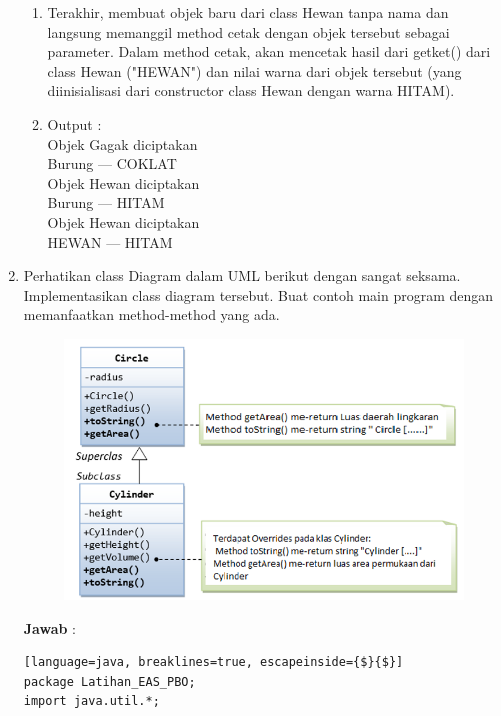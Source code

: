 \documentclass[a4paper, 12pt]{article}
\newcommand{\ans}{\textbf{Jawab} :}
\begin{document}
\begin{enumerate}
\begin{enumerate}[label=\textbullet]
            \item  Terakhir, membuat objek baru dari class Hewan tanpa nama dan langsung memanggil method cetak dengan objek tersebut sebagai parameter. Dalam method cetak, akan mencetak hasil dari getket() dari class Hewan ("HEWAN") dan nilai warna dari objek tersebut (yang diinisialisasi dari constructor class Hewan dengan warna HITAM).\\

            \item[]  
            Output  :\\
            Objek Gagak diciptakan\\
            Burung --- COKLAT \\
            Objek Hewan diciptakan\\
            Burung --- HITAM \\
            Objek Hewan diciptakan\\
            HEWAN --- HITAM 
         
        \end{enumerate}

        \item Perhatikan class Diagram dalam UML berikut dengan sangat seksama. Implementasikan class diagram tersebut. Buat contoh main program dengan memanfaatkan  method-method yang ada.\\
        \begin{figure}[h]
            \centering
            \includegraphics[width=1\linewidth]{No4.png}
        \end{figure}

         \newpage
    \ans

    \begin{lstlisting}[language=java, breaklines=true, escapeinside={$}{$}]
package Latihan_EAS_PBO;
import java.util.*;
    

\end{lstlisting}
\end{enumerate}
\end{document}
